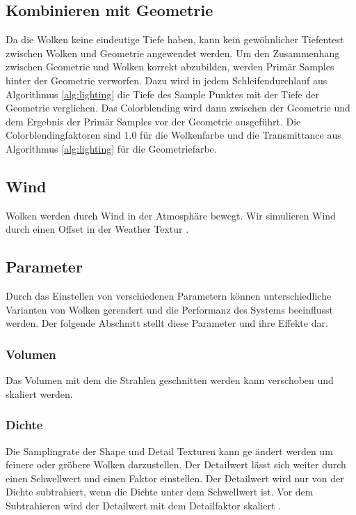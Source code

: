 \subsection{Kombinieren mit Geometrie}
Da die Wolken keine eindeutige Tiefe haben, kann kein gewöhnlicher Tiefentest zwischen Wolken und Geometrie angewendet werden. Um den Zusammenhang zwischen Geometrie und Wolken korrekt abzubilden, werden Primär Samples hinter der Geometrie verworfen. Dazu wird in jedem Schleifendurchlauf aus Algorithmus \ref{alg:lighting} die Tiefe des Sample Punktes mit der Tiefe der Geometrie verglichen. Das Colorblending wird dann zwischen der Geometrie und dem Ergebnis der Primär Samples vor der Geometrie ausgeführt. Die Colorblendingfaktoren sind $ 1.0 $ für die Wolkenfarbe und die Transmittance aus Algorithmus \ref{alg:lighting} für die Geometriefarbe.

\subsection{Wind}
Wolken werden durch Wind in der Atmosphäre bewegt. Wir simulieren Wind durch einen Offset in der Weather Textur \cite{Högfeldt16}.

\subsection{Parameter}
Durch das Einstellen von verschiedenen Parametern können unterschiedliche Varianten von Wolken gerendert und die Performanz des Systems beeinflusst werden. Der folgende Abschnitt stellt diese Parameter und ihre Effekte dar.

\subsubsection{Volumen}
Das Volumen mit dem die Strahlen geschnitten werden kann verschoben und skaliert werden.

\subsubsection{Dichte}
Die Samplingrate der Shape und Detail Texturen kann ge ändert werden um feinere oder gröbere Wolken darzustellen. Der Detailwert lässt sich weiter durch einen Schwellwert und einen Faktor einstellen. Der Detailwert wird nur von der Dichte subtrahiert, wenn die Dichte unter dem Schwellwert ist. Vor dem Subtrahieren wird der Detailwert mit dem Detailfaktor skaliert \cite{Högfeldt16}.

